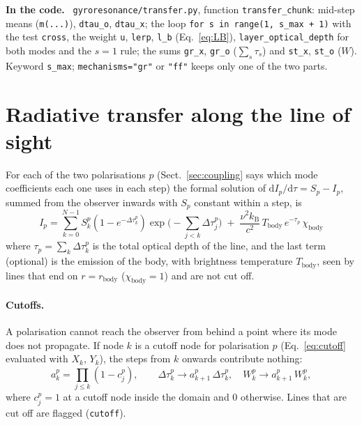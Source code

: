 \documentclass[11pt,a4paper]{article}
\newcommand{\code}[1]{\texttt{#1}}
\newcommand{\dd}{\mathrm{d}}
\newcommand{\kB}{k_\mathrm{B}}
\newenvironment{incode}{\par\smallskip\noindent\begin{minipage}{\linewidth}\small\color{accent!80!black}\textbf{In the code.}~}{\end{minipage}\par\smallskip}
\begin{document}
\begin{incode}
\code{gyroresonance/transfer.py}, function \code{transfer\_chunk}: mid-step means (\code{m(...)}),
\code{dtau\_o}, \code{dtau\_x}; the loop \code{for s in range(1, s\_max + 1)} with the test
\code{cross}, the weight \code{u}, \code{lerp}, \code{l\_b} (Eq.~\ref{eq:LB}),
\code{layer\_optical\_depth} for both modes and the $s=1$ rule; the sums \code{gr\_x},
\code{gr\_o} ($\sum_s\tau_s$) and \code{st\_x}, \code{st\_o} ($W$). Keyword \code{s\_max};
\code{mechanisms="gr"} or \code{"ff"} keeps only one of the two parts.
\end{incode}

\section{Radiative transfer along the line of sight}\label{sec:transfer}

For each of the two polarisations $p$ (Sect.~\ref{sec:coupling} says which mode coefficients
each one uses in each step) the formal solution of
$\dd I_p/\dd\tau=S_p-I_p$, summed from the observer inwards with $S_p$ constant within a step,
is
\begin{equation}
  \boxed{\;
  I_p=\sum_{k=0}^{N-1}S^p_k\left(1-e^{-\Delta\tau^p_k}\right)\exp\!\Big(-\sum_{j<k}\Delta\tau^p_j\Big)
  \;+\;\frac{\nu^2\kB}{c^2}\,T_\text{body}\,e^{-\tau_p}\,\chi_\text{body}\;}
  \label{eq:transfer}
\end{equation}
where $\tau_p=\sum_k\Delta\tau^p_k$ is the total optical depth of the line, and the last term
(optional) is the emission of the body, with brightness temperature $T_\text{body}$, seen by
lines that end on $r=r_\text{body}$ ($\chi_\text{body}=1$) and are not cut off.

\paragraph{Cutoffs.} A polarisation cannot reach the observer from behind a point where its
mode does not propagate. If node $k$ is a cutoff node for polarisation $p$
(Eq.~\ref{eq:cutoff} evaluated with $X_k$, $Y_k$), the steps from $k$ onwards contribute
nothing:
\begin{equation}
  a^p_k=\prod_{j\le k}\left(1-c^p_j\right),\qquad
  \Delta\tau^p_k\to a^p_{k+1}\,\Delta\tau^p_k,\quad W^p_k\to a^p_{k+1}\,W^p_k,
\end{equation}
where $c^p_j=1$ at a cutoff node inside the domain and 0 otherwise. Lines that are cut off
are flagged (\code{cutoff}).
\end{document}
